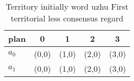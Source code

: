\documentclass[a4paper]{article}
\begin{document}
\begin{table}
\begin{adjustbox}{width=0.5\columnwidth}
\begin{tabular}{|l|l|l|l|l|}
\hline
\textbf{plan} & \multicolumn{1}{c|}{\textbf{0}} & \multicolumn{1}{c|}{\textbf{1}} & \multicolumn{1}{c|}{\textbf{2}} & \multicolumn{1}{c|}{\textbf{3}} \\ \hline
\textbf{$a_0$}  & (0,0) & (1,0) & (2,0) & (3,0) \\ \hline
\textbf{$a_1$}  & (0,0) & (1,0) & (2,0) & (3,0) \\ \hline
\end{tabular}
\end{adjustbox}
\caption{Territory initially word uzhu First territorial less consensus regard
}
\end{table}
\end{document}
